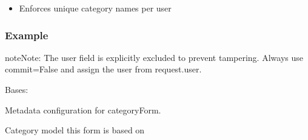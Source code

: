 \documentclass[letterpaper,10pt,english]{sphinxmanual}
\begin{document}
\begin{fulllineitems}
\begin{description}
\begin{itemize}
\item {} 
\sphinxAtStartPar
Enforces unique category names per user

\end{itemize}

\end{description}
\subsubsection*{Example}

\begin{sphinxVerbatim}[commandchars=\\\{\}]
   
 
      
      
    
\end{sphinxVerbatim}

\begin{sphinxadmonition}{note}{Note:}
\sphinxAtStartPar
The user field is explicitly excluded to prevent tampering.
Always use commit=False and assign the user from request.user.
\end{sphinxadmonition}

\begin{fulllineitems}
\label{\detokenize{expensesApp:expensesApp.froms.categoryForm.Meta}}
\pysigstartsignatures
\pysigline
{}
\pysigstopsignatures
\sphinxAtStartPar
Bases: 

\sphinxAtStartPar
Metadata configuration for categoryForm.

\begin{fulllineitems}
\label{\detokenize{expensesApp:expensesApp.froms.categoryForm.Meta.model}}
\pysigstartsignatures
\pysigline
{}
\pysigstopsignatures
\sphinxAtStartPar
Category model this form is based on


\end{fulllineitems}
\end{fulllineitems}
\end{fulllineitems}
\end{document}
